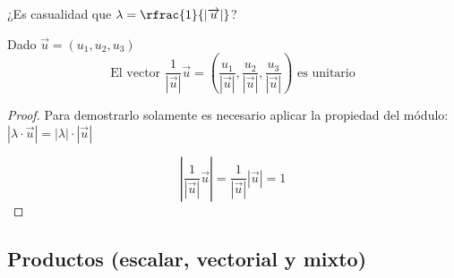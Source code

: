 \obs ¿Es casualidad que $\lambda = \rfrac{1}{\left|\vec{u}\right|}$?  

\begin{prop}
Dado $\vec{u} = (u_1,u_2,u_3)$
\[\text{El vector } \frac{1}{\left|\vec{u}\right|}\vec{u} = \left(\frac{u_1}{\left|\vec{u}\right|},\frac{u_2}{\left|\vec{u}\right|},\frac{u_3}{\left|\vec{u}\right|}\right)\text{ es unitario}\]
\end{prop}

\begin{proof}
Para demostrarlo solamente es necesario aplicar la propiedad del módulo: $\left|\lambda·\vec{u}\right| = |\lambda|·\left|\vec{u}\right|$

\[\left|\frac{1}{\left|\vec{u}\right|}\vec{u}\right| = \frac{1}{\left|\vec{u}\right|}\left|\vec{u}\right| = 1\]
\end{proof}

\subsection{Productos (escalar, vectorial y mixto)}




